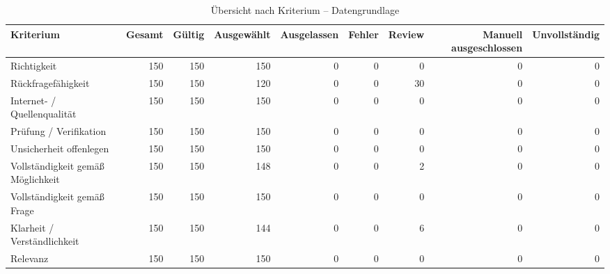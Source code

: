 \begin{table}[htbp]
\centering
\caption{Übersicht nach Kriterium -- Datengrundlage}
\begin{tabular}{lrrrrrrrr}
\toprule
Kriterium & Gesamt & Gültig & Ausgewählt & Ausgelassen & Fehler & Review & Manuell ausgeschlossen & Unvollständig \\
\midrule
Richtigkeit & 150 & 150 & 150 & 0 & 0 & 0 & 0 & 0 \\
Rückfragefähigkeit & 150 & 150 & 120 & 0 & 0 & 30 & 0 & 0 \\
Internet- / Quellenqualität & 150 & 150 & 150 & 0 & 0 & 0 & 0 & 0 \\
Prüfung / Verifikation & 150 & 150 & 150 & 0 & 0 & 0 & 0 & 0 \\
Unsicherheit offenlegen & 150 & 150 & 150 & 0 & 0 & 0 & 0 & 0 \\
Vollständigkeit gemäß Möglichkeit & 150 & 150 & 148 & 0 & 0 & 2 & 0 & 0 \\
Vollständigkeit gemäß Frage & 150 & 150 & 150 & 0 & 0 & 0 & 0 & 0 \\
Klarheit / Verständlichkeit & 150 & 150 & 144 & 0 & 0 & 6 & 0 & 0 \\
Relevanz & 150 & 150 & 150 & 0 & 0 & 0 & 0 & 0 \\
\bottomrule
\end{tabular}
\end{table}
